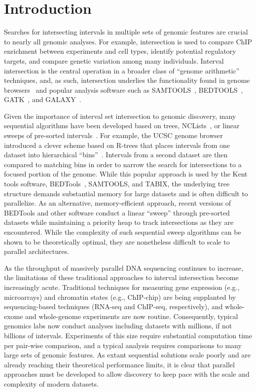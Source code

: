\documentclass{bioinfo}
\begin{document}
	\section{Introduction}

	Searches for intersecting intervals in multiple sets of genomic features are
	crucial to nearly all genomic analyses. For example, intersection is used to
	compare ChIP enrichment between experiments and cell types, identify potential
	regulatory targets, and compare genetic variation among many individuals.
	Interval intersection is the central operation in a broader class of
	``genome arithmetic'' techniques, and, as such, intersection underlies the
	functionality found in genome browsers~\citep{kent2002,robinson2011} and popular
	analysis software such as SAMTOOLS~\citep{li2009}, BEDTOOLS~\citep{quinlan2010}, 
	GATK~\citep{mckenna2010}, and GALAXY~\citep{giardine2005}.

	Given the importance of interval set intersection to genomic discovery, many
	sequential algorithms have been developed based on trees,
	NCLists~\citep{alekseyenko2007}, or linear sweeps of pre-sorted
	intervals~\citep{richardson2006}. For example, the UCSC genome browser
	introduced a clever scheme based on R-trees that places intervals from one
	dataset into hierarchical ``bins''~\citep{kent2002}.  Intervals from a second
	dataset are then compared to matching bins in order to narrow the search for
	intersections to a focused portion of the genome.  While this popular approach
	is used by the Kent tools software, BEDTools~\citep{quinlan2010}, SAMTOOLS, and
	TABIX, the underlying tree structure demands substantial memory for large
	datasets and is often difficult to parallelize. As an alternative,
	memory-efficient approach, recent versions of BEDTools and other software
	conduct a linear ``sweep'' through pre-sorted datasets while maintaining a
	priority heap to track intersections as they are encountered. While the
	complexity of such sequential sweep algorithms can be shown to be theoretically
	optimal, they are nonetheless difficult to scale to parallel architectures.

	As the throughput of massively parallel DNA sequencing continues to increase,
	the limitations of these traditional approaches to interval intersection become
	increasingly acute. Traditional techniques for measuring gene expression (e.g.,
	microarrays) and chromatin states (e.g., ChIP-chip) are being supplanted by
	sequencing-based techniques (RNA-seq and ChIP-seq, respectively), and
	whole-exome and whole-genome experiments are now routine. Consequently, typical
	genomics labs now conduct analyses including datasets with millions, if not billions 
	of intervals. Experiments of this size require substantial computation time per 
	pair-wise comparison, and a typical analysis requires comparisons to many large
	sets of genomic features. As extant sequential solutions scale poorly 
	and are already reaching their theoretical performance limits, it is clear that 
	parallel approaches must be developed to allow discovery to keep pace with the
	scale and complexity of modern datasets.
\end{document}
